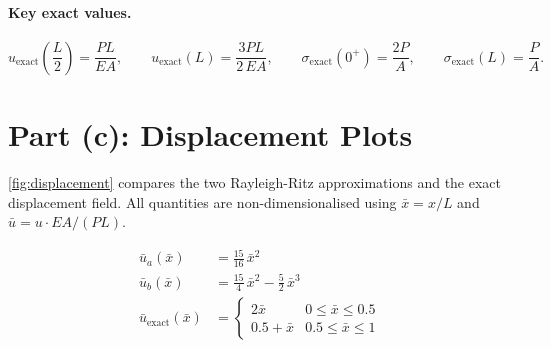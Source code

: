\documentclass[11pt, a4paper]{article}
\begin{document}
\paragraph{Key exact values.}
\[
u_{\text{exact}}\!\left(\frac{L}{2}\right)=\frac{PL}{EA},\qquad
u_{\text{exact}}(L)=\frac{3PL}{2\,EA},\qquad
\sigma_{\text{exact}}(0^+)=\frac{2P}{A},\qquad
\sigma_{\text{exact}}(L)=\frac{P}{A}.
\]

\section{Part (c): Displacement Plots}\label{sec:partc}

\cref{fig:displacement} compares the two Rayleigh-Ritz approximations and the exact displacement field.  All quantities are non-dimensionalised using $\bar{x} = x/L$ and $\bar{u} = u\cdot EA/(PL)$.

\begin{align}
\bar{u}_a(\bar{x}) &= \frac{15}{16}\,\bar{x}^2 \label{eq:ubar_a}\\[4pt]
\bar{u}_b(\bar{x}) &= \frac{15}{4}\,\bar{x}^2 - \frac{5}{2}\,\bar{x}^3 \label{eq:ubar_b}\\[4pt]
\bar{u}_{\text{exact}}(\bar{x}) &= \begin{cases} 2\bar{x} & 0\le\bar{x}\le 0.5 \\ 0.5 + \bar{x} & 0.5\le\bar{x}\le 1 \end{cases}\label{eq:ubar_exact}
\end{align}
\end{document}
